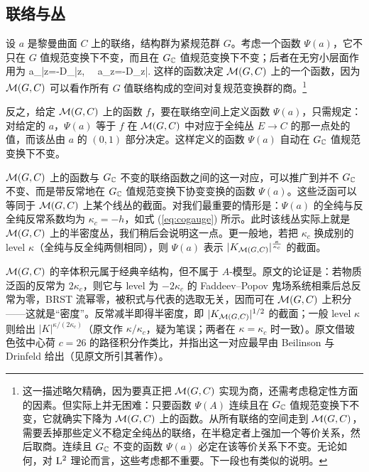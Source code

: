 \subsection{联络与丛}\label{CB}

设 $a$ 是黎曼曲面 $C$ 上的联络，结构群为紧规范群 $G$。考虑一个函数 $\Psi(a)$，它不只在 $G$ 值规范变换下不变，而且在 $G_{\mathbb C}$ 值规范变换下不变；后者在无穷小层面作用为
\be\label{actfor}\delta a_{\bar z}=-D_{\bar z}\lambda, ~~\delta a_z=-D_z\bar\lambda. \ee
这样的函数决定 ${\mathcal M}(G,C)$ 上的一个函数，因为 ${\mathcal M}(G,C)$ 可以看作所有 $G$ 值联络构成的空间对复规范变换群的商。\footnote{这一描述略欠精确，因为要真正把 ${\mathcal M}(G,C)$ 实现为商，还需考虑稳定性方面的因素。但实际上并无困难：只要函数 $\Psi(A)$ 连续且在 $G_{\mathbb C}$ 值规范变换下不变，它就确实下降为 ${\mathcal M}(G,C)$ 上的函数。从所有联络的空间走到 ${\mathcal M}(G,C)$，需要丢掉那些定义不稳定全纯丛的联络，在半稳定者上强加一个等价关系，然后取商。连续且 $G_{\mathbb C}$ 不变的函数 $\Psi(a)$ 必定在该等价关系下不变。无论如何，对 ${\mathrm L}^2$ 理论而言，这些考虑都不重要。下一段也有类似的说明。}

反之，给定 ${\mathcal M}(G,C)$ 上的函数 $f$，要在联络空间上定义函数 $\Psi(a)$，只需规定：对给定的 $a$，$\Psi(a)$ 等于 $f$ 在 ${\mathcal M}(G,C)$ 中对应于全纯丛 $E\to C$ 的那一点处的值，而该丛由 $a$ 的 $(0,1)$ 部分决定。这样定义的函数 $\Psi(a)$ 自动在 $G_{\mathbb C}$ 值规范变换下不变。

${\mathcal M}(G,C)$ 上的函数与 $G_{\mathbb C}$ 不变的联络函数之间的这一对应，可以推广到并不 $G_{\mathbb C}$ 不变、而是带反常地在 $G_{\mathbb C}$ 值规范变换下协变变换的函数 $\Psi(a)$。这些泛函可以等同于 ${\mathcal M}(G,C)$ 上某个线丛的截面。对我们最重要的情形是：$\Psi(a)$ 的全纯与反全纯反常系数均为 $\kappa_c=-h$，如式 (\ref{eq:cogauge}) 所示。此时该线丛实际上就是 ${\mathcal M}(G,C)$ 上的半密度丛，我们稍后会说明这一点。更一般地，若把 $\kappa_c$ 换成别的 level $\kappa$（全纯与反全纯两侧相同），则 $\Psi(a)$ 表示 $|K_{{\mathcal M}(G,C)}|^{\frac{\kappa}{\kappa_c}}$ 的截面。

\begin{yizhu}
${\mathcal M}(G,C)$ 的辛体积元属于经典辛结构，但不属于 $A$-模型。原文的论证是：若物质泛函的反常为 $2\kappa_c$，则它与 level 为 $-2\kappa_c$ 的 Faddeev–Popov 鬼场系统相乘后总反常为零，BRST 流幂零，被积式与代表的选取无关，因而可在 ${\mathcal M}(G,C)$ 上积分——这就是“密度”。反常减半即得半密度，即 $|K_{{\mathcal M}(G,C)}|^{1/2}$ 的截面；一般 level $\kappa$ 则给出 $|K|^{\kappa/(2\kappa_c)}$（原文作 $\kappa/\kappa_c$，疑为笔误；两者在 $\kappa=\kappa_c$ 时一致）。原文借玻色弦中心荷 $c=26$ 的路径积分作类比，并指出这一对应最早由 Beilinson 与 Drinfeld 给出（见原文所引其著作）。
\end{yizhu}


